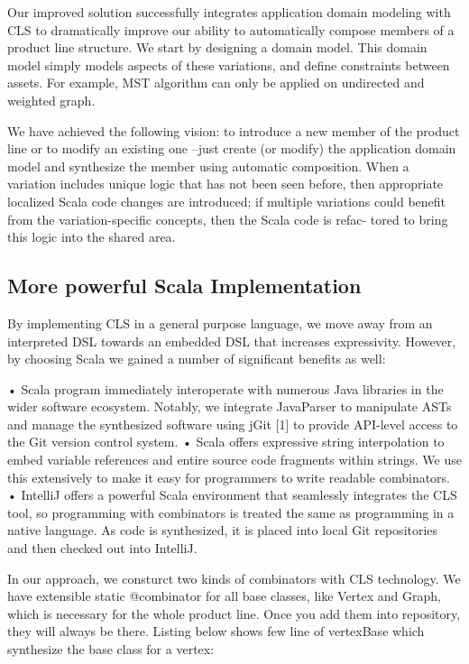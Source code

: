 
Our improved solution successfully integrates application domain modeling with CLS to dramatically improve our
ability to automatically compose members of a product line structure. We start by designing a domain model.
This domain model simply models aspects of these variations, and define constraints between assets. For example,
MST algorithm can only be applied on undirected and weighted graph.

We have achieved the following vision: to introduce a new member of the product line or to modify an
existing one –just create (or modify) the application domain model and synthesize the member using
automatic composition. When a variation includes unique logic that has not been seen before, then appropriate
 localized Scala code changes are introduced; if multiple variations could benefit from the variation-specific concepts,
  then the Scala code is refac- tored to bring this logic into the shared area.

 \subsection{More powerful Scala Implementation}

 By implementing CLS in a general purpose language, we move away from an interpreted DSL towards an embedded DSL
 that increases expressivity. However, by choosing Scala we gained a number of significant benefits as well:

 • Scala program immediately interoperate with numerous Java libraries in the wider software ecosystem. Notably,
 we integrate JavaParser to manipulate ASTs and manage the synthesized software using jGit [1] to
 provide API-level access to the Git version control system.
 • Scala offers expressive string interpolation to embed variable references and entire source code fragments within strings.
 We use this extensively to make it easy for programmers to write readable combinators.
 • IntelliJ offers a powerful Scala environment that seamlessly integrates the CLS tool, so programming with
 combinators is treated the same as programming in a native language. As code is synthesized, it is placed
 into local Git repositories and then checked out into IntelliJ.

 In our approach, we consturct two kinds of combinators with CLS technology. We have extensible static @combinator for all base classes,
  like Vertex and Graph, which is necessary for the whole product line. Once you add them into repository,
   they will always be there. Listing below shows few line of vertexBase which synthesize the base class for a vertex:

